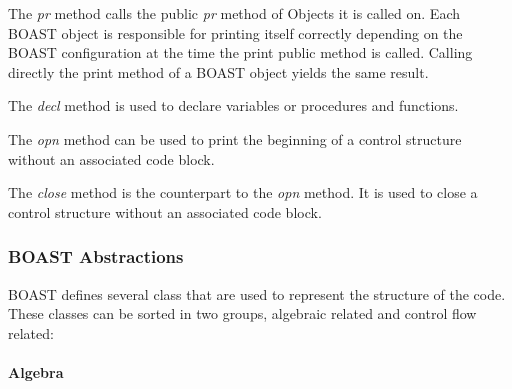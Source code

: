 \documentclass[review]{elsarticle}
\begin{document}
The \emph{pr} method calls the public \emph{pr} method of Objects it is
called on. Each BOAST object is responsible for printing itself correctly
depending on the BOAST configuration at the time the print public method is
called. Calling directly the print method of a BOAST object yields the same
result.

The \emph{decl} method is used to declare variables or procedures and functions.

The \emph{opn} method can be used to print the beginning of a control
structure without an associated code block.

The \emph{close} method is the counterpart to the \emph{opn} method. It is used
to close a control structure without an associated code block.

    \subsubsection{BOAST Abstractions}

BOAST defines several class that are used to represent the structure of the
code. These classes can be sorted in two groups, algebraic related and control
flow related:

      \paragraph{Algebra}
\end{document}
